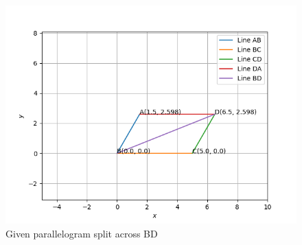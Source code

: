 \documentclass[journal]{IEEEtran}
\begin{document}
\begin{figure}[H]
   \centering
  \includegraphics[width=0.64\columnwidth]{figs/fig.png}
   \caption{Given parallelogram split across BD}
   \label{stemplot}
\end{figure}
\end{document}
